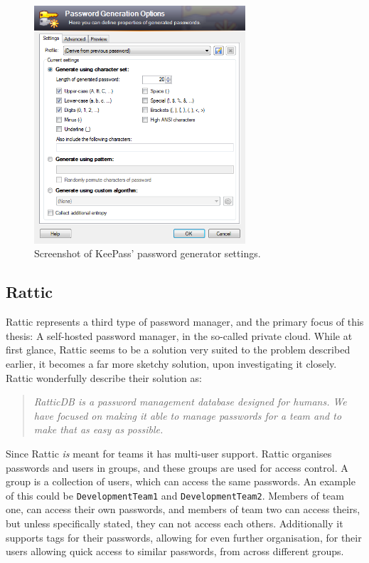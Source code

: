 			\begin{figure}[h!]
				\centering
				\includegraphics[width=0.7\textwidth]{figures/analysis/keepass_newpassword_passwordgen.png}
				\caption{Screenshot of KeePass' password generator settings.}
				\label{fig:keepass_newpassword_passwordgen}
			\end{figure}

		\subsection{Rattic}
			Rattic\cite{rattic_frontpage} represents a third type of password manager, and the primary focus of this thesis: A self-hosted password manager, in the so-called private cloud. While at first glance, Rattic seems to be a solution very suited to the problem described earlier, it becomes a far more sketchy solution, upon investigating it closely. Rattic wonderfully describe their solution as:

			\begin{quote}
				\emph{RatticDB is a password management database designed for humans. We have focused on making it able to manage passwords for a team and to make that as easy as possible.}\\\cite{rattic_frontpage}
			\end{quote}

			Since Rattic \emph{is} meant for teams it has multi-user support. Rattic organises passwords and users in groups, and these groups are used for access control. A group is a collection of users, which can access the same passwords. An example of this could be \verb=DevelopmentTeam1= and \verb=DevelopmentTeam2=. Members of team one, can access their own passwords, and members of team two can access theirs, but unless specifically stated, they can not access each others. Additionally it supports tags for their passwords, allowing for even further organisation, for their users allowing quick access to similar passwords, from across different groups.

